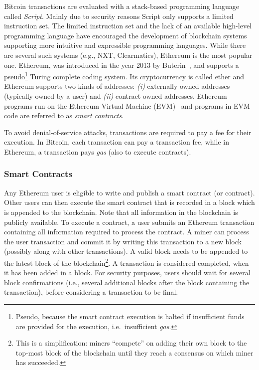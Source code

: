 \documentclass[sigconf]{acmart}
\begin{document}
Bitcoin transactions are evaluated with a stack-based programming language called \emph{Script}. Mainly due to security reasons Script only supports a limited instruction set. The limited instruction set and the lack of an available high-level programming language have encouraged the development of blockchain systems supporting more intuitive and expressible programming languages. While there are several such systems (e.g., NXT, Clearmatics), Ethereum is the most popular one. Ethereum, was introduced in the year 2013 by Buterin~\cite{buterin2014ethereum}, and supports a pseudo\footnote{Pseudo, because the smart contract execution is halted if insufficient funds are provided for the execution, i.e.\ insufficient \emph{gas}.} Turing complete coding system. Its cryptocurrency is called ether and Ethereum supports two kinds of addresses: \emph{(i)} externally owned addresses (typically owned by a user) and \emph{(ii)} contract owned addresses. Ethereum programs run on the {Ethereum Virtual Machine} (EVM)~\cite{wood2014ethereum} and programs in EVM code are referred to as \emph{smart contracts}.

To avoid denial-of-service attacks, transactions are required to pay a fee for their execution. In Bitcoin, each transaction can pay a transaction fee, while in Ethereum, a transaction pays \emph{gas} (also to execute contracts).

\subsubsection{Smart Contracts}
Any Ethereum user is eligible to write and publish a smart contract (or contract). Other users can then execute the smart contract that is recorded in a block which is appended to the blockchain. Note that all information in the blockchain is publicly available.
To execute a contract, a user submits an Ethereum transaction containing all information required to process the contract. A miner can process the user transaction and commit it by writing this transaction to a new block (possibly along with other transactions). A valid block needs to be appended to the latest block of the blockchain\footnote{This is a simplification: miners ``compete'' on adding their own block to the top-most block of the blockchain until they reach a consensus on which miner has succeeded.}. A transaction is considered completed, when it has been added in a block. For security purposes, users should wait for several block confirmations (i.e., several additional blocks after the block containing the transaction), before considering a transaction to be final.
\end{document}
